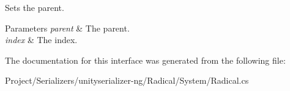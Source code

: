 Sets the parent. 


\begin{DoxyParams}{Parameters}
{\em parent} & The parent.\\
\hline
{\em index} & The index.\\
\hline
\end{DoxyParams}


The documentation for this interface was generated from the following file\+:\begin{DoxyCompactItemize}
\item 
Project/\+Serializers/unityserializer-\/ng/\+Radical/\+System/Radical.\+cs\end{DoxyCompactItemize}
